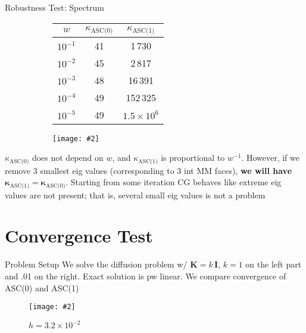 \documentclass{beamer}
\newcommand{\includegraphicsw}[2][1.]{\texttt{[image: \#2]}}
\newcommand{\vect}[1]{\boldsymbol{\mathbf{#1}}}
\begin{document}
	\begin{frame}{Robustness Test: Spectrum}
		\begin{figure}
			\centering
			\caption{Condition Numbers of ASC(0)\,/\,ASC(1) Matrices} 
			\begin{subfigure}{.45\linewidth}
				\centering\footnotesize
				\begin{tabular}[1.2]{ | c | c | c | }
					\hline
					$w$ & $\kappa_{\text{ASC(0)}}$ & $\kappa_{\text{ASC(1)}}$ \\
					\hline
					$10^{-1}$ & 41 & 1\,730 \\ 
					\hline
					$10^{-2}$ & 45 & 2\,817 \\
					\hline
					$10^{-3}$ & 48 & 16\,391 \\
					\hline
					$10^{-4}$ & 49 & 152\,325 \\
					\hline
					$10^{-5}$ & 49 & $1.5\times10^6$ \\
					\hline
				\end{tabular}
			\end{subfigure}%
			\hfill
			\begin{subfigure}{.55\linewidth}
				\centering
				\includegraphicsw{logplot.png}
			\end{subfigure}
		\end{figure}
		$\kappa_{\text{ASC(0)}}$ does not depend on $w$, and $\kappa_{\text{ASC(1)}}$ is proportional to $w^{-1}$. However, if we remove 3 smallest eig values (corresponding to 3 int MM faces), \textbf{we will have $\vect\kappa_{\text{ASC(1)}} = \vect\kappa_{\text{ASC(0)}}$}.
		Starting from some iteration CG behaves like extreme eig values are not present; that is, several small eig values is not a problem 
	\end{frame}

	\section{Convergence Test}
	
	\begin{frame}{Problem Setup}
		We solve the diffusion problem w/ $\vect K = k\,\vect I$, $k = 1$ on the left part and .01 on the right. Exact solution is pw linear. We compare convergence of ASC(0) and ASC(1) 
		\begin{figure}
			\centering
			\includegraphicsw[.5]{skew_asc1.png}
			\caption{$h = 3.2\times10^{-2}$}
		\end{figure}
	\end{frame}
\end{document}
